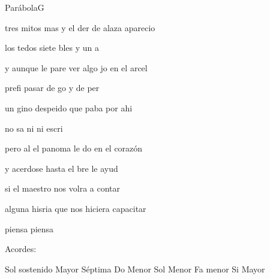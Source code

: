 \documentclass[12pt, spanish]{book}
\begin{document}
\begin{song}{Par\'abola}{G}
        \begin{SBVerse}

            tres mitos mas y el der de alaza aparecio

            los tedos siete bles y un a

            y aunque  le pare ver algo jo en el arcel

            prefi pasar de go y de per
        \end{SBVerse}
        \begin{SBVerse}

            un gino despeido que paba por ahi

            no sa ni  ni escri

            pero al  el panoma le do en el coraz\'on

            y acerdose hasta el bre le ayud

             si el maestro nos volra a contar

            alguna hisria que nos hiciera capacitar

            piensa piensa

        \end{SBVerse}


        \ifChordBk
        \begin{SBOpGroup}
            Acordes:

            \upchord{\Gsseven}Sol sostenido Mayor S\'eptima \hfill
            \upchord{\Cm}\qquad Do Menor \hfill\null\break
            \upchord{\Gm}\qquad Sol Menor \hfill
            \upchord{\Fm}\quad Fa menor \hfill\null\break
            \upchord{\B}\qquad Si Mayor \hfill\null\break
        \end{SBOpGroup}
        \fi
    \end{song}
\end{document}
